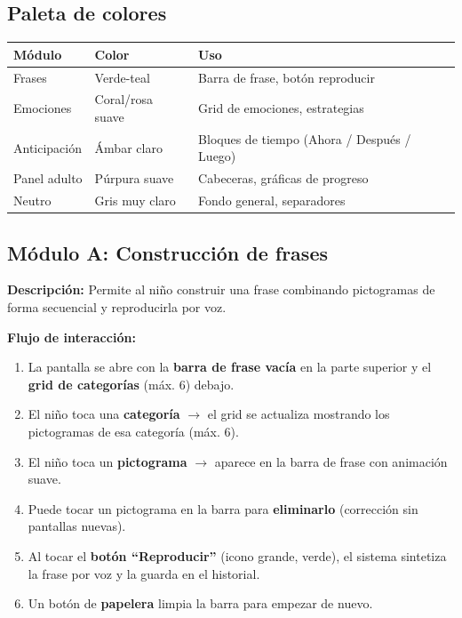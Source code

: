 \documentclass[12pt, a4paper]{article}
\begin{document}
\subsection{Paleta de colores}

\begin{tabular}{L{3cm} L{3cm} L{8cm}}
\toprule
\textbf{Módulo} & \textbf{Color} & \textbf{Uso} \\
\midrule
Frases & Verde-teal & Barra de frase, botón reproducir \\
Emociones & Coral/rosa suave & Grid de emociones, estrategias \\
Anticipación & Ámbar claro & Bloques de tiempo (Ahora / Después / Luego) \\
Panel adulto & Púrpura suave & Cabeceras, gráficas de progreso \\
Neutro & Gris muy claro & Fondo general, separadores \\
\bottomrule
\end{tabular}

\subsection{Módulo A: Construcción de frases}

\textbf{Descripción:} Permite al niño construir una frase combinando pictogramas de forma secuencial y reproducirla por voz.

\textbf{Flujo de interacción:}

\begin{enumerate}
  \item La pantalla se abre con la \textbf{barra de frase vacía} en la parte superior y el \textbf{grid de categorías} (máx. 6) debajo.
  \item El niño toca una \textbf{categoría} $\to$ el grid se actualiza mostrando los pictogramas de esa categoría (máx. 6).
  \item El niño toca un \textbf{pictograma} $\to$ aparece en la barra de frase con animación suave.
  \item Puede tocar un pictograma en la barra para \textbf{eliminarlo} (corrección sin pantallas nuevas).
  \item Al tocar el \textbf{botón ``Reproducir''} (icono grande, verde), el sistema sintetiza la frase por voz y la guarda en el historial.
  \item Un botón de \textbf{papelera} limpia la barra para empezar de nuevo.
\end{enumerate}
\end{document}
